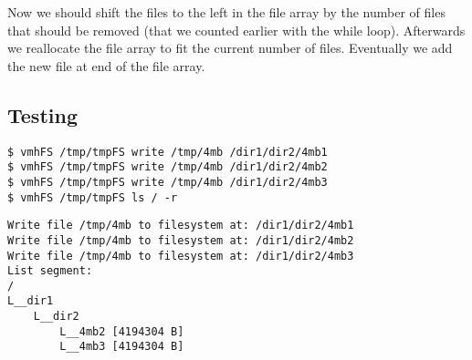 Now we should shift the files to the left in the file array by the number of files that should be removed (that we counted earlier with the while loop). Afterwards we reallocate the file array to fit the current number of files. Eventually we add the new file at end of the file array.

\subsection{Testing}
\begin{lstlisting}
$ vmhFS /tmp/tmpFS write /tmp/4mb /dir1/dir2/4mb1
$ vmhFS /tmp/tmpFS write /tmp/4mb /dir1/dir2/4mb2
$ vmhFS /tmp/tmpFS write /tmp/4mb /dir1/dir2/4mb3
$ vmhFS /tmp/tmpFS ls / -r
\end{lstlisting}

\begin{lstlisting}
Write file /tmp/4mb to filesystem at: /dir1/dir2/4mb1
Write file /tmp/4mb to filesystem at: /dir1/dir2/4mb2
Write file /tmp/4mb to filesystem at: /dir1/dir2/4mb3
List segment:
/
L__dir1
    L__dir2
        L__4mb2 [4194304 B]
        L__4mb3 [4194304 B]
\end{lstlisting}

\newpage
